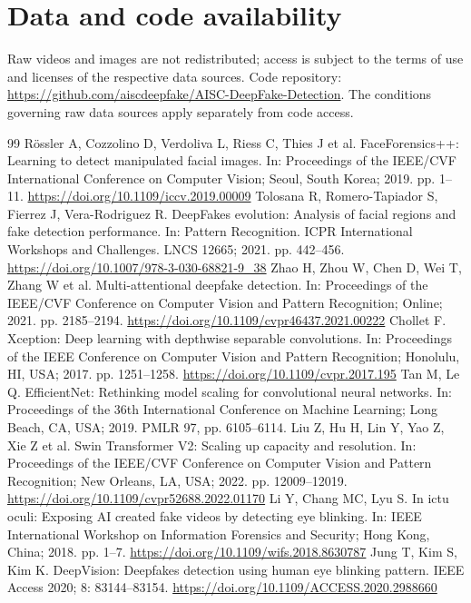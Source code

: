 \documentclass[a4paper]{elektr}
\begin{document}
\section*{Data and code availability}
Raw videos and images are not redistributed; access is subject to the terms of use and licenses of the respective data sources. Code repository: \url{https://github.com/aiscdeepfake/AISC-DeepFake-Detection}. The conditions governing raw data sources apply separately from code access.
\FloatBarrier
\begin{thebibliography}{99}
 Rössler A, Cozzolino D, Verdoliva L, Riess C, Thies J et al. FaceForensics++: Learning to detect manipulated facial images. In: Proceedings of the IEEE/CVF International Conference on Computer Vision; Seoul, South Korea; 2019. pp. 1--11. \url{https://doi.org/10.1109/iccv.2019.00009}
 Tolosana R, Romero-Tapiador S, Fierrez J, Vera-Rodriguez R. DeepFakes evolution: Analysis of facial regions and fake detection performance. In: Pattern Recognition. ICPR International Workshops and Challenges. LNCS 12665; 2021. pp. 442--456. \url{https://doi.org/10.1007/978-3-030-68821-9_38}
 Zhao H, Zhou W, Chen D, Wei T, Zhang W et al. Multi-attentional deepfake detection. In: Proceedings of the IEEE/CVF Conference on Computer Vision and Pattern Recognition; Online; 2021. pp. 2185--2194. \url{https://doi.org/10.1109/cvpr46437.2021.00222}
 Chollet F. Xception: Deep learning with depthwise separable convolutions. In: Proceedings of the IEEE Conference on Computer Vision and Pattern Recognition; Honolulu, HI, USA; 2017. pp. 1251--1258. \url{https://doi.org/10.1109/cvpr.2017.195}
 Tan M, Le Q. EfficientNet: Rethinking model scaling for convolutional neural networks. In: Proceedings of the 36th International Conference on Machine Learning; Long Beach, CA, USA; 2019. PMLR 97, pp. 6105--6114.
 Liu Z, Hu H, Lin Y, Yao Z, Xie Z et al. Swin Transformer V2: Scaling up capacity and resolution. In: Proceedings of the IEEE/CVF Conference on Computer Vision and Pattern Recognition; New Orleans, LA, USA; 2022. pp. 12009--12019. \url{https://doi.org/10.1109/cvpr52688.2022.01170}
 Li Y, Chang MC, Lyu S. In ictu oculi: Exposing AI created fake videos by detecting eye blinking. In: IEEE International Workshop on Information Forensics and Security; Hong Kong, China; 2018. pp. 1--7. \url{https://doi.org/10.1109/wifs.2018.8630787}
 Jung T, Kim S, Kim K. DeepVision: Deepfakes detection using human eye blinking pattern. IEEE Access 2020; 8: 83144--83154. \url{https://doi.org/10.1109/ACCESS.2020.2988660}

\end{thebibliography}
\end{document}
